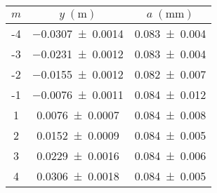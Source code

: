 \begin{tabular}{cc|c}
\toprule
$m$ &      $y \; (\si{\m})$ &  $a \; (\si{\mm})$ \\
\midrule
 -4 & \num{-0.0307+-0.0014} & \num{0.083+-0.004} \\
 -3 & \num{-0.0231+-0.0012} & \num{0.083+-0.004} \\
 -2 & \num{-0.0155+-0.0012} & \num{0.082+-0.007} \\
 -1 & \num{-0.0076+-0.0011} & \num{0.084+-0.012} \\
  1 &  \num{0.0076+-0.0007} & \num{0.084+-0.008} \\
  2 &  \num{0.0152+-0.0009} & \num{0.084+-0.005} \\
  3 &  \num{0.0229+-0.0016} & \num{0.084+-0.006} \\
  4 &  \num{0.0306+-0.0018} & \num{0.084+-0.005} \\
\bottomrule
\end{tabular}
